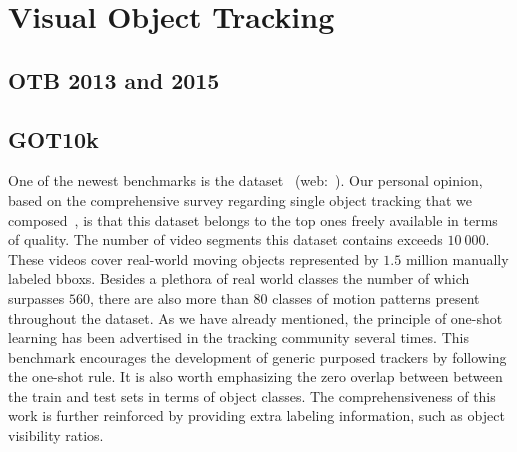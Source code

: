 \section{Visual Object Tracking}

\subsection{OTB 2013 and 2015}
\label{ssec:DatasetOTB1315}


\subsection{GOT10k}
\label{ssec:DatasetGOT10k}

One of the newest benchmarks is the  dataset~\cite{huang2021got10k} (web:~\cite{webgot10kdataset}). Our personal opinion, based on the comprehensive survey regarding single object tracking that we composed~\cite{ondrasovic2021siamese}, is that this dataset belongs to the top ones freely available in terms of quality. The number of video segments this dataset contains exceeds $10\ 000$. These videos cover real-world moving objects represented by $1.5$ million manually labeled \glspl{bbox}. Besides a plethora of real world classes the number of which surpasses $560$, there are also more than $80$ classes of motion patterns present throughout the dataset.
As we have already mentioned, the principle of one-shot learning has been advertised in the tracking community several times. This benchmark encourages the development of generic purposed trackers by following the one-shot rule. It is also worth emphasizing the zero overlap between between the train and test sets in terms of object classes. The comprehensiveness of this work is further reinforced by providing extra labeling information, such as object visibility ratios.

